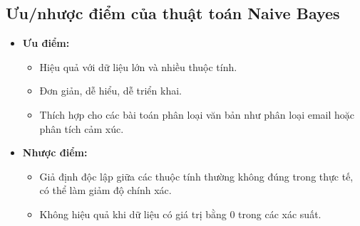 \subsection{Ưu/nhược điểm của thuật toán Naive Bayes}
\begin{itemize}
    \item \textbf{Ưu điểm:}
    \begin{itemize}
        \item Hiệu quả với dữ liệu lớn và nhiều thuộc tính.
        \item Đơn giản, dễ hiểu, dễ triển khai.
        \item Thích hợp cho các bài toán phân loại văn bản như phân loại email hoặc phân tích cảm xúc.
    \end{itemize}
    \item \textbf{Nhược điểm:}
    \begin{itemize}
        \item Giả định độc lập giữa các thuộc tính thường không đúng trong thực tế, có thể làm giảm độ chính xác.
        \item Không hiệu quả khi dữ liệu có giá trị bằng 0 trong các xác suất.
    \end{itemize}
\end{itemize}